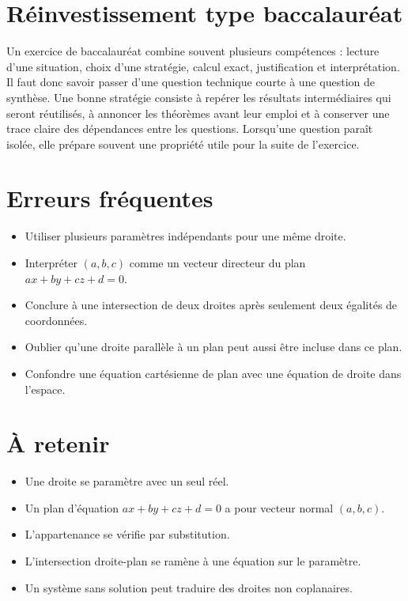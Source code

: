 \section{Réinvestissement type baccalauréat}
Un exercice de baccalauréat combine souvent plusieurs compétences : lecture d'une situation, choix d'une stratégie, calcul exact, justification et interprétation. Il faut donc savoir passer d'une question technique courte à une question de synthèse. Une bonne stratégie consiste à repérer les résultats intermédiaires qui seront réutilisés, à annoncer les théorèmes avant leur emploi et à conserver une trace claire des dépendances entre les questions. Lorsqu'une question paraît isolée, elle prépare souvent une propriété utile pour la suite de l'exercice.

\section{Erreurs fréquentes}
\begin{itemize}
\item Utiliser plusieurs paramètres indépendants pour une même droite.
\item Interpréter $(a,b,c)$ comme un vecteur directeur du plan $ax+by+cz+d=0$.
\item Conclure à une intersection de deux droites après seulement deux égalités de coordonnées.
\item Oublier qu’une droite parallèle à un plan peut aussi être incluse dans ce plan.
\item Confondre une équation cartésienne de plan avec une équation de droite dans l’espace.
\end{itemize}

\section{À retenir}
\begin{aretenir}
\begin{itemize}
\item Une droite se paramètre avec un seul réel.
\item Un plan d’équation $ax+by+cz+d=0$ a pour vecteur normal $(a,b,c)$.
\item L’appartenance se vérifie par substitution.
\item L’intersection droite-plan se ramène à une équation sur le paramètre.
\item Un système sans solution peut traduire des droites non coplanaires.
\end{itemize}
\end{aretenir}
